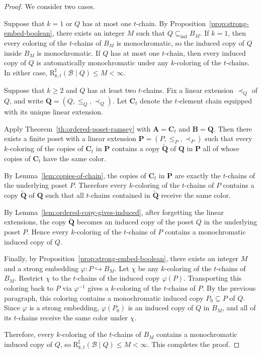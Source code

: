 \documentclass[twoside,12pt]{article}
\newcommand{\ind}{\mathrm{ind}}
\newcommand{\BRs}{\mathrm{R}^{\sharp}}
\begin{document}
\begin{proof}
We consider two cases.

Suppose that $k=1$ or $Q$ has at most one $t$-chain.
By Proposition~\ref{prop:strong-embed-boolean}, there exists an integer $M$ such that
$Q\subseteq_{\ind} B_M$. If $k=1$, then every coloring of the $t$-chains of $B_M$
is monochromatic, so the induced copy of $Q$ inside $B_M$ is monochromatic. If $Q$
has at most one $t$-chain, then every induced copy of $Q$ is automatically monochromatic
under any $k$-coloring of the $t$-chains. In either case,
$\BRs_{k,t}(\mathcal B\mid Q)\le M<\infty$.

Suppose that $k\ge 2$ and $Q$ has at least two $t$-chains.
Fix a linear extension $\prec_Q$ of $Q$, and write
$\mathbf Q=(Q,\le_Q,\prec_Q)$. Let $\mathbf C_t$ denote the $t$-element chain
equipped with its unique linear extension.

Apply Theorem~\ref{th:ordered-poset-ramsey} with
$\mathbf A=\mathbf C_t$ and $\mathbf B=\mathbf Q$. Then there exists a finite poset
with a linear extension $\mathbf P=(P,\le_P,\prec_P)$ such that every $k$-coloring
of the copies of $\mathbf C_t$ in $\mathbf P$ contains a copy
$\widetilde{\mathbf Q}$ of $\mathbf Q$ in $\mathbf P$ all of whose copies of
$\mathbf C_t$ have the same color.

By Lemma~\ref{lem:copies-of-chain}, the copies of $\mathbf C_t$ in $\mathbf P$
are exactly the $t$-chains of the underlying poset $P$. Therefore every
$k$-coloring of the $t$-chains of $P$ contains a copy $\widetilde{\mathbf Q}$ of
$\mathbf Q$ such that all $t$-chains contained in $\widetilde{\mathbf Q}$ receive
the same color.

By Lemma~\ref{lem:ordered-copy-gives-induced}, after forgetting the linear extensions,
the copy $\widetilde{\mathbf Q}$ becomes an induced copy of the poset $Q$ in the
underlying poset $P$. Hence every $k$-coloring of the $t$-chains of $P$ contains a
monochromatic induced copy of $Q$.

Finally, by Proposition~\ref{prop:strong-embed-boolean}, there exists an integer $M$
and a strong embedding $\varphi:P\hookrightarrow B_M$. Let $\chi$ be any $k$-coloring
of the $t$-chains of $B_M$. Restrict $\chi$ to the $t$-chains of the induced copy
$\varphi(P)$. Transporting this coloring back to $P$ via $\varphi^{-1}$ gives a
$k$-coloring of the $t$-chains of $P$. By the previous paragraph, this coloring
contains a monochromatic induced copy $P_0\subseteq P$ of $Q$. Since $\varphi$ is a
strong embedding, $\varphi(P_0)$ is an induced copy of $Q$ in $B_M$, and all of its
$t$-chains receive the same color under $\chi$.

Therefore, every $k$-coloring of the $t$-chains of $B_M$ contains a monochromatic
induced copy of $Q$, so $\BRs_{k,t}(\mathcal B\mid Q)\le M<\infty$. This completes
the proof.
\end{proof}
\end{document}
